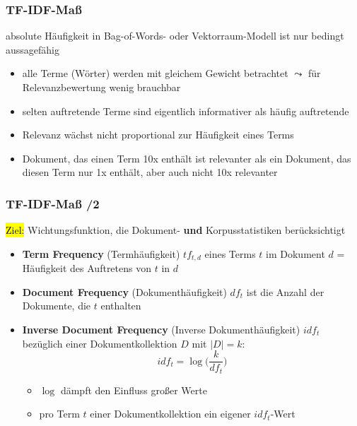  \begin{frame}
\frametitle{TF-IDF-Maß}


absolute Häufigkeit in Bag-of-Words- oder Vektorraum-Modell ist nur bedingt aussagefähig
    \begin{itemize}
        \item alle Terme (Wörter) werden mit gleichem Gewicht betrachtet $\leadsto$ für Relevanzbewertung wenig brauchbar
        \item selten auftretende Terme sind eigentlich informativer als häufig auftretende
        \item Relevanz wächst nicht proportional zur Häufigkeit eines Terms
        \item Dokument, das einen Term 10x enthält ist relevanter als ein Dokument, das diesen Term nur 1x enthält, aber auch nicht 10x relevanter
    \end{itemize}

\end{frame}

 
 \begin{frame}
    \frametitle{TF-IDF-Maß /2}
  
\hl{Ziel:} Wichtungsfunktion, die Dokument- \textbf{und} Korpusstatistiken berücksichtigt

\begin{itemize}
    \item \textbf{Term Frequency} (Termhäufigkeit) $tf_{t,d}$ eines Terms $t$ im Dokument $d$ = Häufigkeit des Auftretens von $t$ in $d$

    \item \textbf{Document Frequency} (Dokumenthäufigkeit) $df_t$ ist die Anzahl der Dokumente, die $t$ enthalten
    \item \textbf{Inverse Document Frequency} (Inverse Dokumenthäufigkeit) $idf_t$ bezüglich einer Dokumentkollektion $D$ mit $|D| = k$: 
    $$
    idf_t = \log \big(\frac{k}{df_t})
    $$
    \begin{itemize}
        \item $\log$ dämpft den Einfluss großer Werte
        \item pro Term $t$ einer Dokumentkollektion ein eigener $idf_t$-Wert
\end{itemize}
\end{itemize}

\end{frame}

